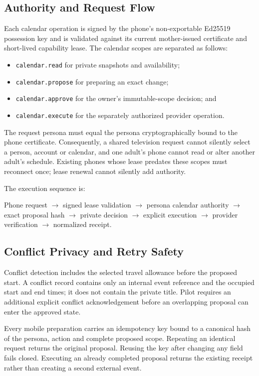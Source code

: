 \subsection{Authority and Request Flow}

Each calendar operation is signed by the phone's non-exportable Ed25519 possession key and is
validated against its current mother-issued certificate and short-lived capability lease.  The
calendar scopes are separated as follows:
\begin{itemize}
  \item \texttt{calendar.read} for private snapshots and availability;
  \item \texttt{calendar.propose} for preparing an exact change;
  \item \texttt{calendar.approve} for the owner's immutable-scope decision; and
  \item \texttt{calendar.execute} for the separately authorized provider operation.
\end{itemize}

The request persona must equal the persona cryptographically bound to the phone certificate.
Consequently, a shared television request cannot silently select a person, account or calendar,
and one adult's phone cannot read or alter another adult's schedule.  Existing phones whose lease
predates these scopes must reconnect once; lease renewal cannot silently add authority.

The execution sequence is:
\begin{center}
Phone request $\rightarrow$ signed lease validation $\rightarrow$ persona calendar authority
$\rightarrow$ exact proposal hash $\rightarrow$ private decision $\rightarrow$ explicit execution
$\rightarrow$ provider verification $\rightarrow$ normalized receipt.
\end{center}

\subsection{Conflict Privacy and Retry Safety}

Conflict detection includes the selected travel allowance before the proposed start.  A conflict
record contains only an internal event reference and the occupied start and end times; it does not
contain the private title.  Pilot requires an additional explicit conflict acknowledgement before
an overlapping proposal can enter the approved state.

Every mobile preparation carries an idempotency key bound to a canonical hash of the persona,
action and complete proposed scope.  Repeating an identical request returns the original proposal.
Reusing the key after changing any field fails closed.  Executing an already completed proposal
returns the existing receipt rather than creating a second external event.

